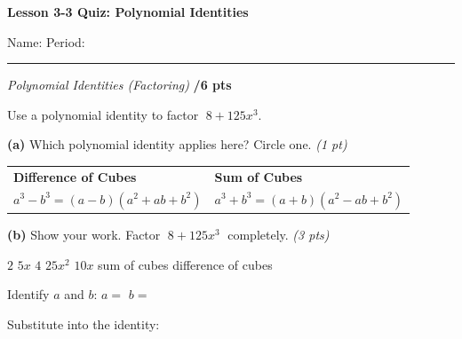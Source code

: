 \documentclass[11pt]{article}
\newcommand{\blank}[1][2cm]{\underline{\hspace{#1}}}
\begin{document}

\begin{center}
{\LARGE\bfseries Lesson 3-3 Quiz: Polynomial Identities}
\end{center}

\vspace{-6pt}
\noindent Name: \blank[7cm] \hfill Period: \blank[1.5cm]

\vspace{2pt}
\noindent\rule{\linewidth}{1.5pt}

\vspace{8pt}

 {\itshape Polynomial Identities (Factoring)} \hfill \textbf{/6 pts}

\vspace{6pt}
\noindent Use a polynomial identity to factor $\;8 + 125x^3$.

\vspace{8pt}
\noindent\textbf{(a)} Which polynomial identity applies here? Circle one. \hfill \textit{(1 pt)}

\vspace{4pt}
\noindent
\begin{tabular}{|p{}|p{}|}
\hline
\textbf{Difference of Cubes} & \textbf{Sum of Cubes} \\[2pt]
$a^3 - b^3 = (a - b)(a^2 + ab + b^2)$ & $a^3 + b^3 = (a + b)(a^2 - ab + b^2)$ \\[4pt]
\hline
\end{tabular}

\vspace{8pt}
\noindent\textbf{(b)} Show your work. Factor $\;8 + 125x^3\;$ completely. \hfill \textit{(3 pts)}

\vspace{4pt}
\begin{tcolorbox}[wordbank]
$2$ \qquad $5x$ \qquad $4$ \qquad $25x^2$ \qquad $10x$ \qquad sum of cubes \qquad difference of cubes
\end{tcolorbox}

\vspace{6pt}
\noindent Identify $a$ and $b$: \qquad $a = $ \blank[2cm] \qquad $b = $ \blank[2cm]

\vspace{10pt}
\noindent Substitute into the identity:
\end{document}

